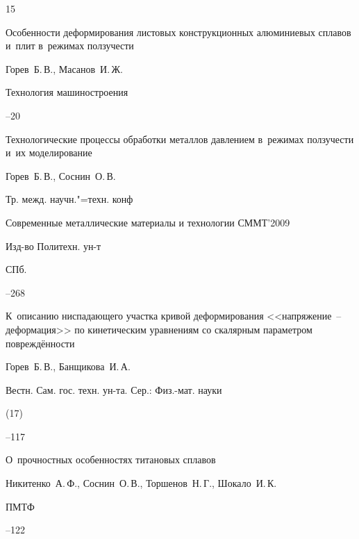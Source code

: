 \begin{thebibliography}{15}


\paper  Особенности деформирования листовых конструкционных алюминиевых сплавов и~плит в~режимах ползучести

\by Горев~Б.\,В., Масанов~И.\,Ж.

\jour Технология машиностроения



--20




\paper Технологические процессы обработки металлов давлением в~режимах ползучести и~их моделирование

\by Горев~Б.\,В., Соснин~О.\,В.

\bookinfo Тр. межд. научн."=техн. конф

\inbook Современные металлические материалы и технологии СММТ'2009

\publ Изд-во Политехн. ун-т

\publaddr СПб.


--268




\paper К~описанию ниспадающего участка кривой деформирования <<напряжение~-- деформация>> по кинетическим уравнениям со скалярным параметром повреждённости

\by Горев~Б.\,В., Банщикова~И.\,А.

\jour Вестн. Сам. гос. техн. ун-та. Сер.: Физ.-мат. науки


 (17)

--117




\paper  О~прочностных особенностях титановых сплавов

\by Никитенко~А.\,Ф.,  Соснин~О.\,В., Торшенов~Н.\,Г., Шокало~И.\,К.

\jour ПМТФ



--122





\end{thebibliography}
